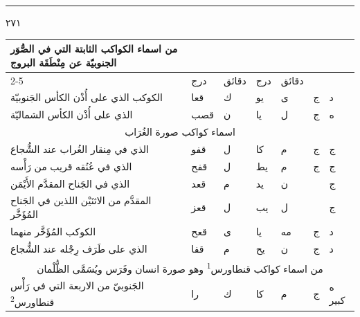 \documentclass[11pt]{article}
\begin{document}
\par\vspace{3mm}\noindent\rule{40mm}{.4pt}\par{}
\clearpage
{\large \textarabic{٢٧١}}\par\vspace{2mm}
\begin{Arabic}\begin{tabular}{|p{84mm}|>{\centering\arraybackslash}p{9mm}|>{\centering\arraybackslash}p{9mm}|>{\centering\arraybackslash}p{9mm}|>{\centering\arraybackslash}p{9mm}|>{\centering\arraybackslash}p{14mm}|>{\centering\arraybackslash}p{17mm}|}\hline
\multirow{2}{*}{\parbox{80mm}{\centering من اسماء الكواكب الثابتة التي في الصُّوَر الجنوبيّة عن مِنْطَقَة البروج}} & \multicolumn{2}{c|}{الطول} & \multicolumn{2}{c|}{العرض} & \multirow{2}{*}{\parbox{13mm}{\centering\small علامات الجهة}} & \multirow{2}{*}{\parbox{16mm}{\centering\small مراتب العظمة}} \\ \cline{2-5}
 & {\small درج} & {\small دقائق} & {\small درج} & {\small دقائق} & & \\ \hline
الكوكب الذي على أُذْن الكأس الجَنوبيّة & قعا & ك & يو & ى & ج & د \\
الذي على أُذْن الكأس الشماليّة & قصب & ن & يا & ل & ج & ه \\
\hline
\multicolumn{7}{|c|}{\large اسماء كواكب صورة الغُرَاب} \\ \hline
الذي في مِنقار الغُراب عند الشُّجاع & قفو & ل & كا & م & ج & ج \\
الذي في عُنُقه قريب من رَأْسه & قفح & ل & يط & م & ج & ج \\
الذي في الجَناح المقدَّم الأَيْمَن & قعد & م & يد & ن &  & ج \\
المقدَّم من الاثنَيْن اللذين في الجَناح المُؤَخَّر & قعز & ل & يب & ل &  & ج \\
الكوكب المُؤَخَّر منهما & قعح & ى & يا & مه & ج & د \\
الذي على طَرَف رِجْله عند الشُّجاع & قفا & م & يح & ن & ج & د \\
\hline
\multicolumn{7}{|c|}{\large من اسماء كواكب قنطاورس\textsuperscript{1} وهو صورة انسان وفَرَس ويُسَمَّى الظُّلْمان} \\ \hline
الجَنوبيّ من الاربعة التي في رَأْس قنطاورس\textsuperscript{2} & را & ك & كا & م & ج & ه كبير \\

\end{tabular}
\end{Arabic}
\end{document}
